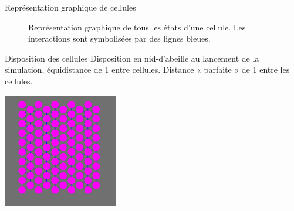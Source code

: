 \documentclass{beamer}
\begin{document}
\begin{frame}{Représentation graphique de cellules}
  \begin{figure}
    \caption{Représentation graphique de tous les états d'une cellule. Les interactions sont symbolisées par des lignes bleues.}
  \end{figure}
\end{frame}

\begin{frame}{Disposition des cellules}
  Disposition en nid-d'abeille au lancement de la simulation, équidistance de 1 entre cellules.
  Distance « parfaite » de 1 entre les cellules.
  \begin{center}
    \includegraphics[width=5cm]{Images/hexagone.png}
  \end{center}
\end{frame}
\end{document}
